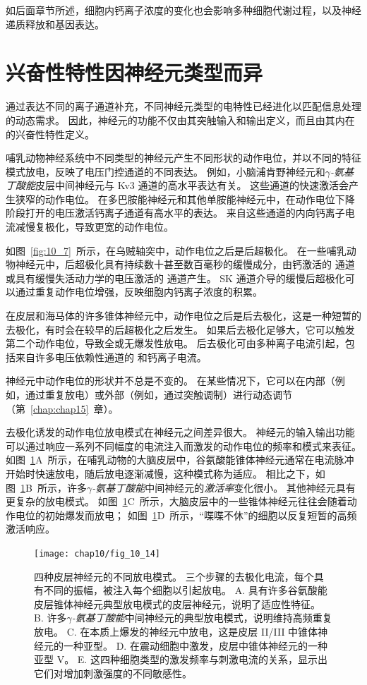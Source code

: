 如后面章节所述，细胞内钙离子浓度的变化也会影响多种细胞代谢过程，以及神经递质释放和基因表达。



\section{兴奋性特性因神经元类型而异}

通过表达不同的离子通道补充，不同神经元类型的电特性已经进化以匹配信息处理的动态需求。
因此，神经元的功能不仅由其突触输入和输出定义，而且由其内在的兴奋性特性定义。


哺乳动物神经系统中不同类型的神经元产生不同形状的动作电位，并以不同的特征模式放电，反映了电压门控通道的不同表达。
例如，小脑浦肯野神经元和\textit{$\gamma$-氨基丁酸能}皮层中间神经元与 Kv3 通道的高水平表达有关。
这些通道的快速激活会产生狭窄的动作电位。
在多巴胺能神经元和其他单胺能神经元中，在动作电位下降阶段打开的电压激活钙离子通道有高水平的表达。
来自这些通道的内向钙离子电流减慢复极化，导致更宽的动作电位。


如图~\ref{fig:10_7}~所示，在乌贼轴突中，动作电位之后是后超极化。
在一些哺乳动物神经元中，后超极化具有持续数十甚至数百毫秒的缓慢成分，由钙激活的  通道或具有缓慢失活动力学的电压激活的  通道产生。
SK 通道介导的缓慢后超极化可以通过重复动作电位增强，反映细胞内钙离子浓度的积累。


在皮层和海马体的许多锥体神经元中，动作电位之后是后去极化，这是一种短暂的去极化，有时会在较早的后超极化之后发生。
如果后去极化足够大，它可以触发第二个动作电位，导致全或无爆发性放电。
后去极化可由多种离子电流引起，包括来自许多电压依赖性通道的  和钙离子电流。


神经元中动作电位的形状并不总是不变的。
在某些情况下，它可以在内部（例如，通过重复放电）或外部（例如，通过突触调制）进行动态调节（第~\ref{chap:chap15}~章）。


去极化诱发的动作电位放电模式在神经元之间差异很大。 
神经元的输入输出功能可以通过响应一系列不同幅度的电流注入而激发的动作电位的频率和模式来表征。
如图~\ref{fig:10_14}A~所示，在哺乳动物的大脑皮层中，谷氨酸能锥体神经元通常在电流脉冲开始时快速放电，随后放电逐渐减慢，这种模式称为适应。
相比之下，如图~\ref{fig:10_14}B~所示，许多\textit{$\gamma$-氨基丁酸能}中间神经元的\textit{激活率}变化很小。
其他神经元具有更复杂的放电模式。
如图~\ref{fig:10_14}C~所示，大脑皮层中的一些锥体神经元往往会随着动作电位的初始爆发而放电；
如图~\ref{fig:10_14}D~所示，“喋喋不休”的细胞以反复短暂的高频激活响应。


\begin{figure}[htbp]
	\centering
	\texttt{[image: chap10/fig\_10\_14]}
	\caption{四种皮层神经元的不同放电模式。
		三个步骤的去极化电流，每个具有不同的振幅，被注入每个细胞以引起放电\cite{nowak2003electrophysiological}。
		A. 具有许多谷氨酸能皮层锥体神经元典型放电模式的皮层神经元，说明了适应性特征。
		B. 许多\textit{$\gamma$-氨基丁酸能}中间神经元的典型放电模式，说明维持高频重复放电。
		C. 在本质上爆发的神经元中放电，这是皮层 II/III 中锥体神经元的一种亚型。
		D. 在震动细胞中激发，皮层中锥体神经元的一种亚型 V。
		E. 这四种细胞类型的激发频率与刺激电流的关系，显示出它们对增加刺激强度的不同敏感性。}
	\label{fig:10_14}
\end{figure}


